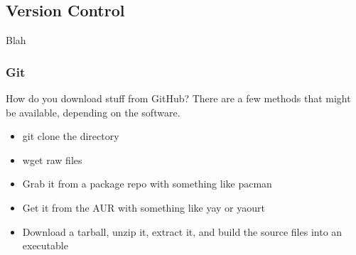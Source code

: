 






\subsection{Version Control}

Blah

\subsubsection{Git}


How do you download stuff from GitHub? There are a few methods that might be available, depending on the software.
\begin{itemize}
	\item git clone the directory
	\item wget raw files
	\item Grab it from a package repo with something like pacman
	\item Get it from the AUR with something like yay or yaourt
	\item Download a tarball, unzip it, extract it, and build the source files into an executable
\end{itemize}

